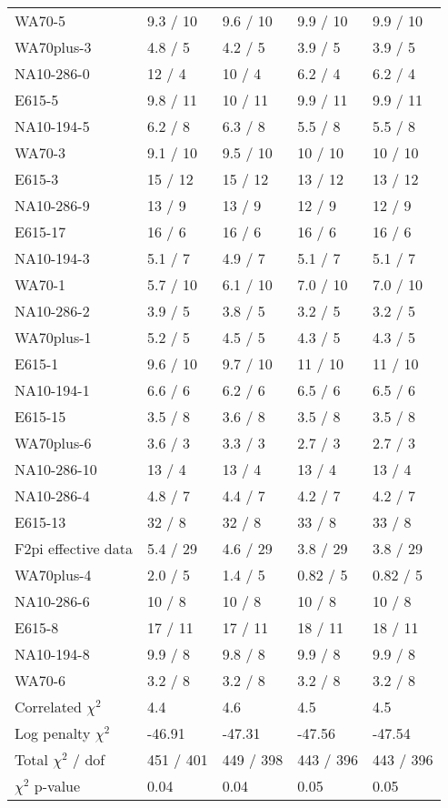 \documentclass[11pt]{report}
\begin{document}
\begin{table}
\begin{center}
{\begin{tabular}{lp{2.02cm}p{2.02cm}p{2.02cm}p{2.02cm}}
  WA70-5 & 9.3 / 10& 9.6 / 10& 9.9 / 10& 9.9 / 10  \\ 
  WA70plus-3 & 4.8 / 5& 4.2 / 5& 3.9 / 5& 3.9 / 5  \\ 
  NA10-286-0 & 12 / 4& 10 / 4& 6.2 / 4& 6.2 / 4  \\ 
  E615-5 & 9.8 / 11& 10 / 11& 9.9 / 11& 9.9 / 11  \\ 
  NA10-194-5 & 6.2 / 8& 6.3 / 8& 5.5 / 8& 5.5 / 8  \\ 
  WA70-3 & 9.1 / 10& 9.5 / 10& 10 / 10& 10 / 10  \\ 
  E615-3 & 15 / 12& 15 / 12& 13 / 12& 13 / 12  \\ 
  NA10-286-9 & 13 / 9& 13 / 9& 12 / 9& 12 / 9  \\ 
  E615-17 & 16 / 6& 16 / 6& 16 / 6& 16 / 6  \\ 
  NA10-194-3 & 5.1 / 7& 4.9 / 7& 5.1 / 7& 5.1 / 7  \\ 
  WA70-1 & 5.7 / 10& 6.1 / 10& 7.0 / 10& 7.0 / 10  \\ 
  NA10-286-2 & 3.9 / 5& 3.8 / 5& 3.2 / 5& 3.2 / 5  \\ 
  WA70plus-1 & 5.2 / 5& 4.5 / 5& 4.3 / 5& 4.3 / 5  \\ 
  E615-1 & 9.6 / 10& 9.7 / 10& 11 / 10& 11 / 10  \\ 
  NA10-194-1 & 6.6 / 6& 6.2 / 6& 6.5 / 6& 6.5 / 6  \\ 
  E615-15 & 3.5 / 8& 3.6 / 8& 3.5 / 8& 3.5 / 8  \\ 
  WA70plus-6 & 3.6 / 3& 3.3 / 3& 2.7 / 3& 2.7 / 3  \\ 
  NA10-286-10 & 13 / 4& 13 / 4& 13 / 4& 13 / 4  \\ 
  NA10-286-4 & 4.8 / 7& 4.4 / 7& 4.2 / 7& 4.2 / 7  \\ 
  E615-13 & 32 / 8& 32 / 8& 33 / 8& 33 / 8  \\ 
  F2pi effective data & 5.4 / 29& 4.6 / 29& 3.8 / 29& 3.8 / 29  \\ 
  WA70plus-4 & 2.0 / 5& 1.4 / 5& 0.82 / 5& 0.82 / 5  \\ 
  NA10-286-6 & 10 / 8& 10 / 8& 10 / 8& 10 / 8  \\ 
  E615-8 & 17 / 11& 17 / 11& 18 / 11& 18 / 11  \\ 
  NA10-194-8 & 9.9 / 8& 9.8 / 8& 9.9 / 8& 9.9 / 8  \\ 
  WA70-6 & 3.2 / 8& 3.2 / 8& 3.2 / 8& 3.2 / 8  \\ 
  Correlated $\chi^2$  & 4.4& 4.6& 4.5& 4.5  \\ 
  Log penalty $\chi^2$  & -46.91& -47.31& -47.56& -47.54  \\ 
  \rowcolor{white}
      \midrule
  Total $\chi^2$ / dof  & 451 / 401& 449 / 398& 443 / 396& 443 / 396  \\ 
  \rowcolor{white}
      \midrule
  $\chi^2$ p-value  & 0.04 & 0.04 & 0.05 & 0.05   \\ 
      \bottomrule
    \end{tabular}
  }
  \end{center}
\end{table}
\end{document}
